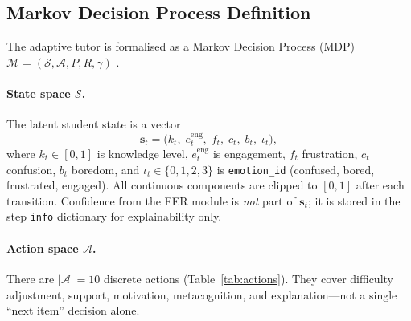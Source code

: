 \subsection{Markov Decision Process Definition}\label{sec:method_mdp}

The adaptive tutor is formalised as a Markov Decision Process (MDP) $\mathcal{M} = (\mathcal{S}, \mathcal{A}, P, R, \gamma)$ \cite{sutton_rl_book_2018}.

\paragraph{State space $\mathcal{S}$.}
The latent student state is a vector
\begin{equation}
    \mathbf{s}_t = \bigl(k_t,\; e^{\mathrm{eng}}_t,\; f_t,\; c_t,\; b_t,\; \iota_t\bigr),
    \label{eq:student_state}
\end{equation}
where $k_t \in [0,1]$ is knowledge level, $e^{\mathrm{eng}}_t$ is engagement, $f_t$ frustration, $c_t$ confusion, $b_t$ boredom, and $\iota_t \in \{0,1,2,3\}$ is \texttt{emotion\_id} (confused, bored, frustrated, engaged). All continuous components are clipped to $[0,1]$ after each transition. Confidence from the FER module is \emph{not} part of $\mathbf{s}_t$; it is stored in the step \texttt{info} dictionary for explainability only.

\paragraph{Action space $\mathcal{A}$.}
There are $|\mathcal{A}| = 10$ discrete actions (Table~\ref{tab:actions}). They cover difficulty adjustment, support, motivation, metacognition, and explanation---not a single ``next item'' decision alone.

